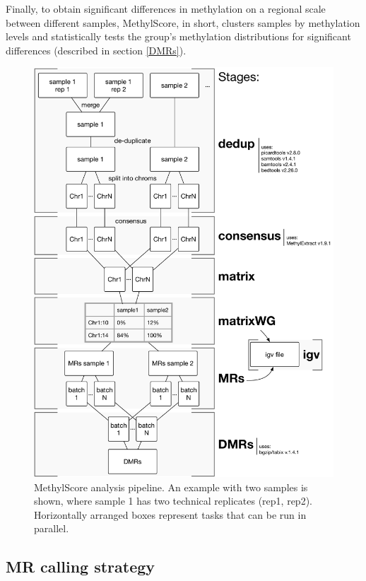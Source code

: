 \documentclass{article}
\begin{document}
Finally, to obtain significant differences in methylation on a regional scale between different samples, MethylScore, in short, clusters samples by methylation levels and statistically tests the group's methylation distributions for significant differences (described in section \ref{DMRs}).

\begin{figure}[p]
	\centering
	\includegraphics[width=.95\linewidth]{graphics/workflow.pdf}
	\caption[MethylScore analysis pipeline.]{MethylScore analysis pipeline. An example with two samples is shown, where sample 1 has two technical replicates (rep1, rep2). Horizontally arranged boxes represent tasks that can be run in parallel.}
	\label{fig:MSpipeline}
\end{figure}


\subsection{MR calling strategy}
\label{MRs}
\end{document}
